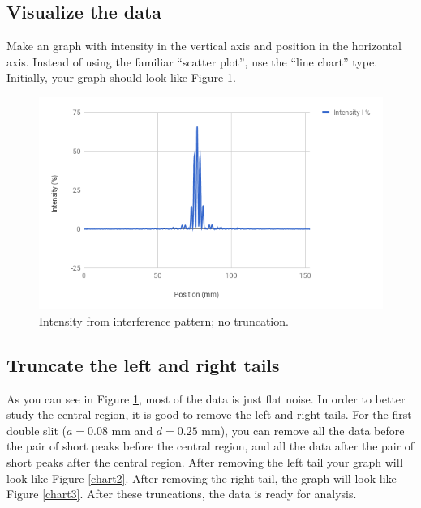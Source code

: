 \subsection{Visualize the data}
Make an graph with intensity in the vertical axis and position in the horizontal axis. Instead of using the familiar ``scatter plot'', use the ``line chart'' type. Initially, your graph should look like Figure \ref{chart1}.
\begin{figure}[ht!]
	\centering
	\includegraphics[scale=0.77]{image/10-interference/chart1.png}
	\caption{Intensity from interference pattern; no truncation.}
	\label{chart1}
\end{figure}
\subsection{Truncate the left and right tails}
As you can see in Figure \ref{chart1}, most of the data is just flat noise. In order to better study the central region, it is good to remove the left and right tails. For the first double slit ($a = 0.08$ mm and $d = 0.25$ mm), you can remove all the data before the pair of short peaks before the central region, and all the data after the pair of short peaks after the central region. After removing the left tail your graph will look like Figure \ref{chart2}. After removing the right tail, the graph will look like Figure \ref{chart3}. After these truncations, the data is ready for analysis.

